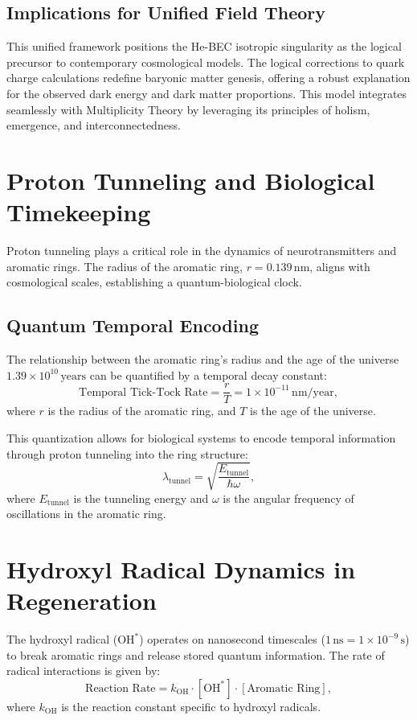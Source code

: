 \documentclass{article}
\theoremstyle{plain}
\begin{document}
\subsection{Implications for Unified Field Theory}
This unified framework positions the He-BEC isotropic singularity as the logical precursor to contemporary cosmological models. The logical corrections to quark charge calculations redefine baryonic matter genesis, offering a robust explanation for the observed dark energy and dark matter proportions. This model integrates seamlessly with Multiplicity Theory by leveraging its principles of holism, emergence, and interconnectedness.

\section{Proton Tunneling and Biological Timekeeping}
Proton tunneling plays a critical role in the dynamics of neurotransmitters and aromatic rings. The radius of the aromatic ring, \( r = 0.139 \, \text{nm} \), aligns with cosmological scales, establishing a quantum-biological clock.

\subsection{Quantum Temporal Encoding}
The relationship between the aromatic ring's radius and the age of the universe \( 1.39 \times 10^{10} \, \text{years} \) can be quantified by a temporal decay constant:
\begin{equation}
\text{Temporal Tick-Tock Rate} = \frac{r}{T} = 1 \times 10^{-11} \, \text{nm/year},
\end{equation}
where \( r \) is the radius of the aromatic ring, and \( T \) is the age of the universe.

This quantization allows for biological systems to encode temporal information through proton tunneling into the ring structure:
\begin{equation}
\lambda_{\text{tunnel}} = \sqrt{\frac{E_{\text{tunnel}}}{\hbar \omega}},
\end{equation}
where \( E_{\text{tunnel}} \) is the tunneling energy and \( \omega \) is the angular frequency of oscillations in the aromatic ring.

\section{Hydroxyl Radical Dynamics in Regeneration}
The hydroxyl radical (\( \text{OH}^* \)) operates on nanosecond timescales (\( 1 \, \text{ns} = 1 \times 10^{-9} \, \text{s} \)) to break aromatic rings and release stored quantum information. The rate of radical interactions is given by:
\begin{equation}
\text{Reaction Rate} = k_{\text{OH}} \cdot [\text{OH}^*] \cdot [\text{Aromatic Ring}],
\end{equation}
where \( k_{\text{OH}} \) is the reaction constant specific to hydroxyl radicals.
\end{document}
